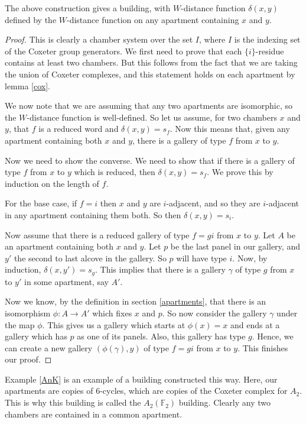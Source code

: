 \documentclass[11pt]{article}
\begin{document}
\begin{theorem}\textnormal{\cite[p.34]{RON}}
    The above construction gives a building, with $W$-distance function $\delta(x,y)$ defined by the $W$-distance function on any apartment containing $x$ and $y$. 
\end{theorem}

\begin{proof}
    This is clearly a chamber system over the set $I$, where $I$ is the indexing set of the Coxeter group generators. We first need to prove that each $\{i\}$-residue contains at least two chambers. But this follows from the fact that we are taking the union of Coxeter complexes, and this statement holds on each apartment by lemma \ref{cox}. 

    We now note that we are assuming that any two apartments are isomorphic, so the $W$-distance function is well-defined. So let us assume, for two chambers $x$ and $y$, that $f$ is a reduced word and $\delta(x,y)=s_f$. Now this means that, given any apartment containing both $x$ and $y$, there is a gallery of type $f$ from $x$ to $y$. 

    Now we need to show the converse. We need to show that if there is a gallery of type $f$ from $x$ to $y$ which is reduced, then $\delta(x,y)=s_f$. We prove this by induction on the length of $f$. 

    For the base case, if $f=i$ then $x$ and $y$ are $i$-adjacent, and so they are $i$-adjacent in any apartment containing them both. So then $\delta(x,y)=s_i$.

    Now assume that there is a reduced gallery of type $f=gi$ from $x$ to $y$. Let $A$ be an apartment containing both $x$ and $y$. Let $p$ be the last panel in our gallery, and $y'$ the second to last alcove in the gallery. So $p$ will have type $i$. Now, by induction, $\delta(x,y')=s_g$. This implies that there is a gallery $\gamma$ of type $g$ from $x$ to $y'$ in some apartment, say $A'$.
    
    Now we know, by the definition in section \ref{apartments}, that there is an isomorphism $\phi : A\to A'$ which fixes $x$ and $p$. So now consider the gallery $\gamma$ under the map $\phi$. This gives us a gallery which starts at $\phi(x)=x$ and ends at a gallery which has $p$ as one of its panels. Also, this gallery has type $g$. Hence, we can create a new gallery $(\phi(\gamma),y)$ of type $f=gi$ from $x$ to $y$. This finishes our proof.
\end{proof}


\begin{example}
    Example \ref{AnK} is an example of a building constructed this way. Here, our apartments are copies of 6-cycles, which are copies of the Coxeter complex for $A_2$. This is why this building is called the $A_2(\mathbb{F}_2)$ building. Clearly any two chambers are contained in a common apartment. 
\end{example}
\end{document}
